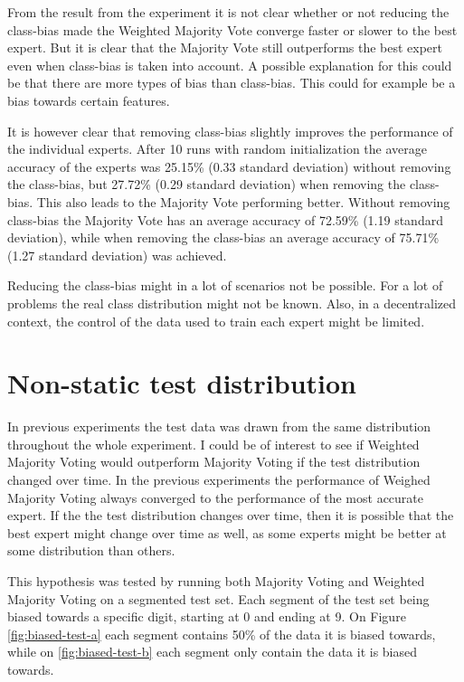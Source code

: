 From the result from the experiment it is not clear whether or not reducing the class-bias made the Weighted Majority Vote converge faster or slower to the best expert. But it is clear that the Majority Vote still outperforms the best expert even when class-bias is taken into account. A possible explanation for this could be that there are more types of bias than class-bias. This could for example be a bias towards certain features.

It is however clear that removing class-bias slightly improves the performance of the individual experts. After 10 runs with random initialization the average accuracy of the experts was 25.15\% (0.33 standard deviation) without removing the class-bias, but 27.72\% (0.29 standard deviation) when removing the class-bias. This also leads to the Majority Vote performing better. Without removing class-bias the Majority Vote has an average accuracy of 72.59\% (1.19 standard deviation), while when removing the class-bias an average accuracy of 75.71\% (1.27 standard deviation) was achieved.

Reducing the class-bias might in a lot of scenarios not be possible. For a lot of problems the real class distribution might not be known. Also, in a decentralized context, the control of the data used to train each expert might be limited.

\section{Non-static test distribution}

In previous experiments the test data was drawn from the same distribution throughout the whole experiment. I could be of interest to see if Weighted Majority Voting would outperform Majority Voting if the test distribution changed over time. In the previous experiments the performance of Weighed Majority Voting always converged to the performance of the most accurate expert. If the the test distribution changes over time, then it is possible that the best expert might change over time as well, as some experts might be better at some distribution than others.

This hypothesis was tested by running both Majority Voting and Weighted Majority Voting on a segmented test set. Each segment of the test set being biased towards a specific digit, starting at 0 and ending at 9. On Figure \ref{fig:biased-test-a} each segment contains 50\% of the data it is biased towards, while on \ref{fig:biased-test-b} each segment only contain the data it is biased towards.

